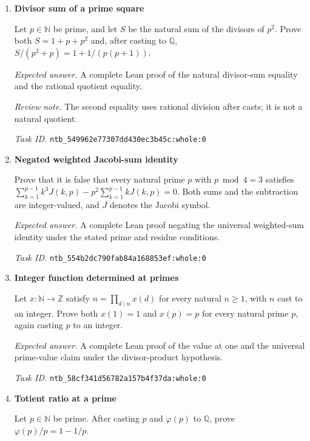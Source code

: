 \documentclass[11pt]{article}
\newcommand{\pth}[1]{\nolinkurl{#1}}
\begin{document}
\begin{enumerate}[label={TEST \arabic*.},leftmargin=4.5em,itemsep=1em]
\emph{Review note.} The conclusion does not require p to divide n or to be less than n.

\emph{Task ID.} \pth{ntb_507de6b94de228dd2f022572:whole:0}

\item \textbf{Divisor sum of a prime square}\label{qn:test:31}

Let $p\in\mathbb{N}$ be prime, and let $S$ be the natural sum of the divisors of $p^2$. Prove both $S=1+p+p^2$ and, after casting to $\mathbb{Q}$, $S/(p^2+p)=1+1/(p(p+1))$.

\emph{Expected answer.} A complete Lean proof of the natural divisor-sum equality and the rational quotient equality.

\emph{Review note.} The second equality uses rational division after casts; it is not a natural quotient.

\emph{Task ID.} \pth{ntb_549962e77307dd430ec3b45c:whole:0}

\item \textbf{Negated weighted Jacobi-sum identity}\label{qn:test:32}

Prove that it is false that every natural prime $p$ with $p\bmod4=3$ satisfies $\sum_{k=1}^{p-1}k^3J(k,p)-p^2\sum_{k=1}^{p-1}kJ(k,p)=0$. Both sums and the subtraction are integer-valued, and $J$ denotes the Jacobi symbol.

\emph{Expected answer.} A complete Lean proof negating the universal weighted-sum identity under the stated prime and residue conditions.

\emph{Task ID.} \pth{ntb_554b2dc790fab84a168853ef:whole:0}

\item \textbf{Integer function determined at primes}\label{qn:test:33}

Let $x:\mathbb{N}\to\mathbb{Z}$ satisfy $n=\prod_{d\mid n}x(d)$ for every natural $n\ge1$, with $n$ cast to an integer. Prove both $x(1)=1$ and $x(p)=p$ for every natural prime $p$, again casting $p$ to an integer.

\emph{Expected answer.} A complete Lean proof of the value at one and the universal prime-value claim under the divisor-product hypothesis.

\emph{Task ID.} \pth{ntb_58cf341d56782a157b4f37da:whole:0}

\item \textbf{Totient ratio at a prime}\label{qn:test:34}

Let $p\in\mathbb{N}$ be prime. After casting $p$ and $\varphi(p)$ to $\mathbb{Q}$, prove $\varphi(p)/p=1-1/p$.


\end{enumerate}
\end{document}
